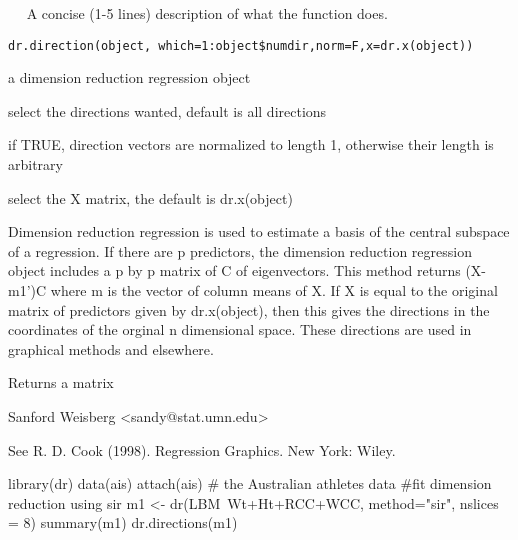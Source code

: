 \begin{Description}\relax
~~ A concise (1-5 lines) description of what the function does. ~~\end{Description}
\begin{Usage}
\begin{verbatim}
dr.direction(object, which=1:object$numdir,norm=F,x=dr.x(object))
\end{verbatim}
\end{Usage}
\begin{Arguments}
\begin{ldescription}
\item[\code{object}] a dimension reduction regression object 
\item[\code{which}] select the directions wanted, default is all directions 
\item[\code{norm}] if TRUE, direction vectors are normalized to length 1, otherwise
their length is arbitrary
\item[\code{x}] select the X matrix, the default is dr.x(object)
\end{ldescription}
\end{Arguments}
\begin{Details}\relax
Dimension reduction regression is used to estimate a basis of the central
subspace of a regression.  If there are p predictors, the dimension
reduction regression object includes a p by p matrix of C of eigenvectors.
This method returns (X-m1')C where m is the vector of column means of X.  If
X is equal to the original matrix of predictors given by dr.x(object), then
this gives the directions in the coordinates of the orginal n dimensional
space.  These directions are used in graphical methods and elsewhere.\end{Details}
\begin{Value}
Returns a matrix\end{Value}
\begin{Author}\relax
Sanford Weisberg <sandy@stat.umn.edu>\end{Author}
\begin{References}\relax
See R. D. Cook (1998).  Regression Graphics.  New York:  Wiley.\end{References}
\begin{SeeAlso}\relax
{}\end{SeeAlso}
\begin{Examples}
\begin{ExampleCode}
library(dr)
data(ais)
attach(ais)  # the Australian athletes data
#fit dimension reduction using sir
m1 <- dr(LBM~Wt+Ht+RCC+WCC, method="sir", nslices = 8)
summary(m1)
dr.directions(m1)
\end{ExampleCode}
\end{Examples}

